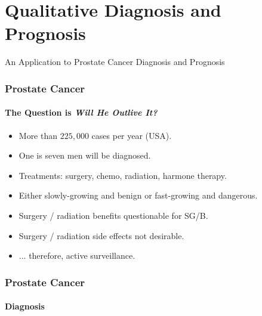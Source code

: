 \section{Qualitative Diagnosis and Prognosis}
\begin{frame}
    \begin{block}{}
        An Application to Prostate Cancer Diagnosis and Prognosis
    \end{block}
\end{frame}



\begin{frame}
\frametitle{Prostate Cancer}
\framesubtitle{The Question is \emph{Will He Outlive It?}}


    \begin{block}{}
        \begin{itemize}
            \item More than $225,000$ cases per year (USA).
            \item One is seven men will be diagnosed.
            \item Treatments: surgery, chemo, radiation, harmone therapy.
            \item Either slowly-growing  and benign or fast-growing
                and dangerous.
            \item Surgery / radiation benefits questionable for SG/B.
            \item Surgery / radiation side effects not desirable.
            \item ... therefore, active surveillance.
        \end{itemize}
    \end{block}

\end{frame}

\begin{frame}
\frametitle{Prostate Cancer}
\framesubtitle{Diagnosis}

\centering

\end{frame}


